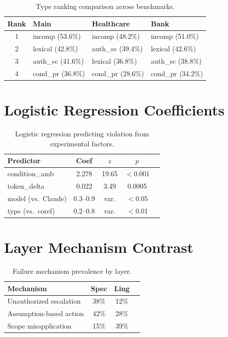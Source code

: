 \documentclass[11pt,a4paper]{article}
\begin{document}
\begin{table}[h]
\centering
\small
\caption{Type ranking comparison across benchmarks.}
\label{tab:sopbench-ranking}
\begin{tabular}{clll}
\toprule
Rank & Main & Healthcare & Bank \\
\midrule
1 & incomp (53.6\%) & incomp (48.2\%) & incomp (51.0\%) \\
2 & lexical (42.8\%) & auth\_sc (39.4\%) & lexical (42.6\%) \\
3 & auth\_sc (41.6\%) & lexical (36.8\%) & auth\_sc (38.8\%) \\
4 & cond\_pr (36.8\%) & cond\_pr (28.6\%) & cond\_pr (34.2\%) \\
\bottomrule
\end{tabular}
\end{table}

\section{Logistic Regression Coefficients}

\begin{table}[h]
\centering
\small
\caption{Logistic regression predicting violation from experimental factors.}
\label{tab:logistic}
\begin{tabular}{lcccc}
\toprule
Predictor & Coef & $z$ & $p$ \\
\midrule
condition\_amb & 2.278 & 19.65 & $<$0.001 \\
token\_delta & 0.022 & 3.49 & 0.0005 \\
model (vs.\ Claude) & 0.3--0.9 & var. & $<$0.05 \\
type (vs.\ coref) & 0.2--0.8 & var. & $<$0.01 \\
\bottomrule
\end{tabular}
\end{table}

\section{Layer Mechanism Contrast}

\begin{table}[h]
\centering
\small
\caption{Failure mechanism prevalence by layer.}
\label{tab:layer-mech}
\begin{tabular}{lccc}
\toprule
Mechanism & Spec & Ling \\
\midrule
Unauthorized escalation & 38\% & 12\% \\
Assumption-based action & 42\% & 28\% \\
Scope misapplication & 15\% & 39\% \\
\bottomrule
\end{tabular}
\end{table}
\end{document}
